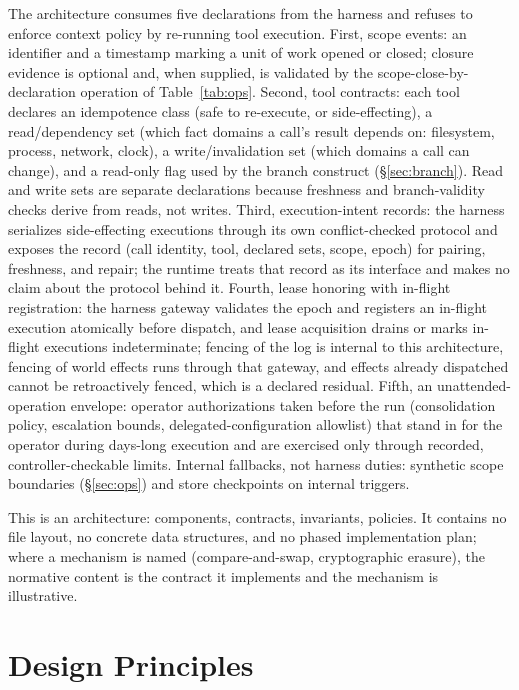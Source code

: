 \documentclass[11pt]{article}
\begin{document}
The architecture consumes five declarations from the harness and refuses to enforce context policy by re-running tool execution. First, scope events: an identifier and a timestamp marking a unit of work opened or closed; closure evidence is optional and, when supplied, is validated by the scope-close-by-declaration operation of Table~\ref{tab:ops}. Second, tool contracts: each tool declares an idempotence class (safe to re-execute, or side-effecting), a read/dependency set (which fact domains a call's result depends on: filesystem, process, network, clock), a write/invalidation set (which domains a call can change), and a read-only flag used by the branch construct (\S\ref{sec:branch}). Read and write sets are separate declarations because freshness and branch-validity checks derive from reads, not writes. Third, execution-intent records: the harness serializes side-effecting executions through its own conflict-checked protocol and exposes the record (call identity, tool, declared sets, scope, epoch) for pairing, freshness, and repair; the runtime treats that record as its interface and makes no claim about the protocol behind it. Fourth, lease honoring with in-flight registration: the harness gateway validates the epoch and registers an in-flight execution atomically before dispatch, and lease acquisition drains or marks in-flight executions indeterminate; fencing of the log is internal to this architecture, fencing of world effects runs through that gateway, and effects already dispatched cannot be retroactively fenced, which is a declared residual. Fifth, an unattended-operation envelope: operator authorizations taken before the run (consolidation policy, escalation bounds, delegated-configuration allowlist) that stand in for the operator during days-long execution and are exercised only through recorded, controller-checkable limits. Internal fallbacks, not harness duties: synthetic scope boundaries (\S\ref{sec:ops}) and store checkpoints on internal triggers.

This is an architecture: components, contracts, invariants, policies. It contains no file layout, no concrete data structures, and no phased implementation plan; where a mechanism is named (compare-and-swap, cryptographic erasure), the normative content is the contract it implements and the mechanism is illustrative.

\section{Design Principles}
\end{document}
